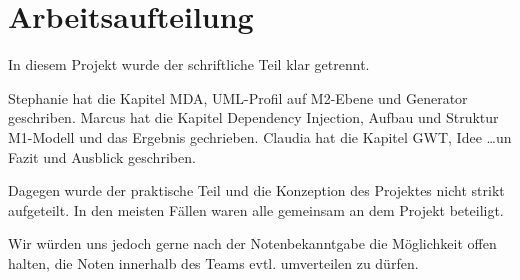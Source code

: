 \chapter{Arbeitsaufteilung}
\label{Arbeitsaufteilung}
In diesem Projekt wurde der schriftliche Teil klar getrennt.

Stephanie hat die Kapitel MDA, UML-Profil auf M2-Ebene und Generator geschriben.
Marcus hat die Kapitel Dependency Injection, Aufbau und Struktur M1-Modell und
das Ergebnis gechrieben.
Claudia hat die Kapitel GWT, Idee \ldots un Fazit und Ausblick geschriben.

Dagegen wurde der praktische Teil und die Konzeption des Projektes nicht
strikt aufgeteilt. In den meisten Fällen waren alle gemeinsam an dem Projekt
beteiligt.

Wir würden uns jedoch gerne nach der Notenbekanntgabe die Möglichkeit offen
halten, die Noten innerhalb des Teams evtl. umverteilen zu dürfen.


